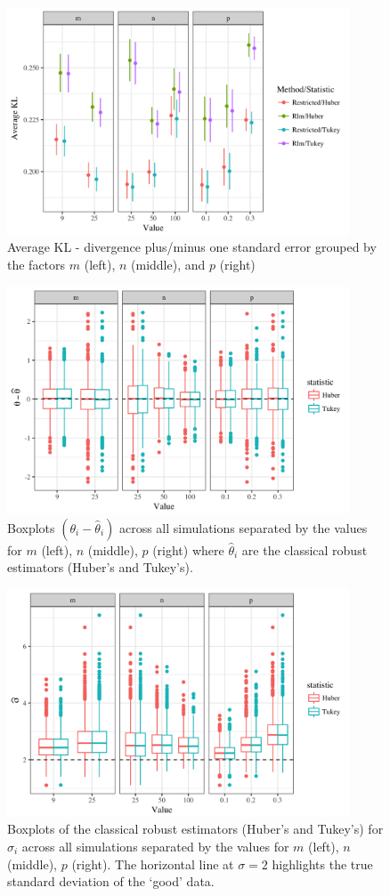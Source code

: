 \documentclass[ba]{imsart}
\begin{document}
\begin{figure}[t]
\centering
\includegraphics[width = 4in]{kl_sim2_mnp.png}
\caption{Average KL - divergence plus/minus one standard error grouped by the factors $m$ (left), $n$ (middle), and $p$ (right)}
\label{kl_mnp}
\end{figure}
\begin{figure}[t]
\centering
\includegraphics[width = 4in]{rlm_mnp_theta.png}
\caption{Boxplots $(\theta_{i} - \hat\theta_{i})$ across all simulations separated by the values for $m$ (left), $n$ (middle), $p$ (right) where $\hat\theta_{i}$ are the classical robust estimators (Huber's and Tukey's).}
\label{boxTheta}
\end{figure}
\begin{figure}[t]
\centering
\includegraphics[width = 4in]{rlm_mnp_sigma.png}
\caption{Boxplots of the classical robust estimators (Huber's and Tukey's) for $\sigma_{i}$ across all simulations separated by the values for $m$ (left), $n$ (middle), $p$ (right). The horizontal line at $\sigma = 2$ highlights the true standard deviation of the `good' data.}
\label{boxSigma}
\end{figure}
\end{document}
